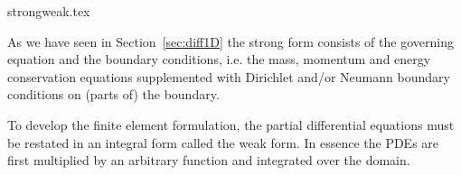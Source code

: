 \begin{flushright} {\tiny {\color{gray} strongweak.tex}} \end{flushright}


As we have seen in Section~\ref{sec:diff1D}
the strong form consists of the governing equation and the boundary conditions, i.e. 
the mass, momentum and energy conservation equations supplemented with Dirichlet and/or Neumann
boundary conditions on (parts of) the boundary.

To develop the finite element formulation, the partial differential equations 
must be restated in an integral form called the weak form. In essence the PDEs are 
first multiplied by an arbitrary function and integrated over the domain.

